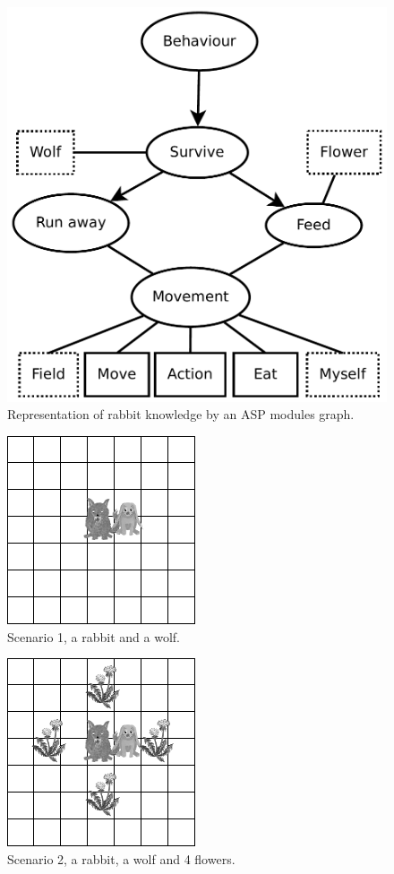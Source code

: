 \documentclass{aamas2012}
\begin{document}
	\begin{figure}
		\centering
		\includegraphics[keepaspectratio=true, scale=0.4]{modular_knowledge_experiment.pdf}
		\caption
		{
			\label{modular_knowledge_experiment}
			Representation of rabbit knowledge by an ASP modules graph.
		}
	\end{figure}
	
	\begin{figure}
		\centering
		\includegraphics[keepaspectratio=true, scale=0.5]{scenario_1.png}
		\caption
		{
			\label{scenario_1}
			Scenario 1, a rabbit and a wolf.
		}
	\end{figure}

	\begin{figure}
		\centering
		\includegraphics[keepaspectratio=true, scale=0.5]{scenario_2.png}
		\caption
		{
			\label{scenario_2}
			Scenario 2, a rabbit, a wolf and 4 flowers.
		}
	\end{figure}
	
\end{document}

